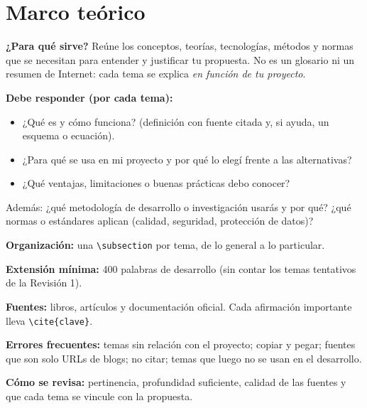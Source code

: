 
\section{Marco teórico} \label{sec:marco_teorico} %

\begin{guia}
\textbf{¿Para qué sirve?} Reúne los conceptos, teorías, tecnologías, métodos y normas que se necesitan para entender y
justificar tu propuesta. No es un glosario ni un resumen de Internet: cada tema se explica \emph{en función de tu proyecto}.

\textbf{Debe responder (por cada tema):}
\begin{itemize}[nosep,leftmargin=*]
  \item ¿Qué es y cómo funciona? (definición con fuente citada y, si ayuda, un esquema o ecuación).
  \item ¿Para qué se usa en mi proyecto y por qué lo elegí frente a las alternativas?
  \item ¿Qué ventajas, limitaciones o buenas prácticas debo conocer?
\end{itemize}
Además: ¿qué metodología de desarrollo o investigación usarás y por qué? ¿qué normas o estándares aplican (calidad,
seguridad, protección de datos)?

\textbf{Organización:} una \verb|\subsection| por tema, de lo general a lo particular.

\textbf{Extensión mínima:} 400 palabras de desarrollo (sin contar los temas tentativos de la Revisión 1).

\textbf{Fuentes:} libros, artículos y documentación oficial. Cada afirmación importante lleva \verb|\cite{clave}|.

\textbf{Errores frecuentes:} temas sin relación con el proyecto; copiar y pegar; fuentes que son solo URLs de blogs; no
citar; temas que luego no se usan en el desarrollo.

\textbf{Cómo se revisa:} pertinencia, profundidad suficiente, calidad de las fuentes y que cada tema se vincule con la
propuesta.
\end{guia}

